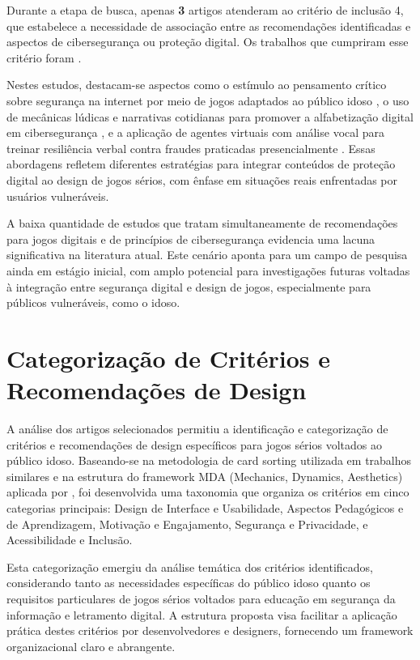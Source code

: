 Durante a etapa de busca, apenas \textbf{3} artigos atenderam ao critério de inclusão 4, que estabelece a necessidade de associação entre as recomendações identificadas e aspectos de cibersegurança ou proteção digital. Os trabalhos que cumpriram esse critério foram \cite{machado2017learning, bernardino2021serious, van2020serious}.

Nestes estudos, destacam-se aspectos como o estímulo ao pensamento crítico sobre segurança na internet por meio de jogos adaptados ao público idoso \cite{machado2017learning}, o uso de mecânicas lúdicas e narrativas cotidianas para promover a alfabetização digital em cibersegurança \cite{bernardino2021serious}, e a aplicação de agentes virtuais com análise vocal para treinar resiliência verbal contra fraudes praticadas presencialmente \cite{van2020serious}. Essas abordagens refletem diferentes estratégias para integrar conteúdos de proteção digital ao design de jogos sérios, com ênfase em situações reais enfrentadas por usuários vulneráveis.

A baixa quantidade de estudos que tratam simultaneamente de recomendações para jogos digitais e de princípios de cibersegurança evidencia uma lacuna significativa na literatura atual. Este cenário aponta para um campo de pesquisa ainda em estágio inicial, com amplo potencial para investigações futuras voltadas à integração entre segurança digital e design de jogos, especialmente para públicos vulneráveis, como o idoso.

\section{Categorização de Critérios e Recomendações de Design}
\label{sec:categorizacao}

A análise dos artigos selecionados permitiu a identificação e categorização de critérios e recomendações de design específicos para jogos sérios voltados ao público idoso. Baseando-se na metodologia de card sorting utilizada em trabalhos similares \cite{pillon2022proposicao} e na estrutura do framework MDA (Mechanics, Dynamics, Aesthetics) aplicada por \cite{belarmino2021criterios}, foi desenvolvida uma taxonomia que organiza os critérios em cinco categorias principais: Design de Interface e Usabilidade, Aspectos Pedagógicos e de Aprendizagem, Motivação e Engajamento, Segurança e Privacidade, e Acessibilidade e Inclusão.

Esta categorização emergiu da análise temática dos critérios identificados, considerando tanto as necessidades específicas do público idoso quanto os requisitos particulares de jogos sérios voltados para educação em segurança da informação e letramento digital. A estrutura proposta visa facilitar a aplicação prática destes critérios por desenvolvedores e designers, fornecendo um framework organizacional claro e abrangente.

